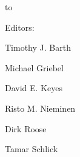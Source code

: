 \bgroup
\setcounter{page}{1}

\nolinenumbers


\def\plseries#1{\noindent \fontfamily{ptm}\fontsize{16}{18}{\selectfont #1\par}}


\def\plserieseditor#1{\noindent \fontfamily{ptm}\fontsize{10}{12}{\selectfont #1\par}}

\def\plseriesid#1{\noindent \fontfamily{ptm}\fontsize{9}{11}{\selectfont #1\par}}

\def\pleditor#1{\noindent \fontfamily{ptm}\fontsize{14}{16}{\selectfont #1\par}}

\def\pltitle#1{\noindent \fontfamily{ptm}\fontsize{28}{30}{\selectfont #1\par}}

\def\plsubtitle#1{\noindent \fontfamily{ptm}\fontsize{18}{20}{\selectfont #1\par}}



\begin{minipage}{0.96\textwidth}{\vspace*{-40pt}\hfill{\fontsize{30}{32}\selectfont{84}}}\end{minipage}

\vspace*{-6pt}

\hbox to \textwidth{\hrulefill}

\thispagestyle{empty}

\vspace*{18pt}

{\noindent{}\fontsize{12}{14}\selectfont Editors:\par\vspace*{9pt}
\noindent Timothy J. Barth\par
\noindent Michael Griebel\par
\noindent David E. Keyes\par
\noindent Risto M. Nieminen\par
\noindent Dirk Roose\par
\noindent Tamar Schlick\par}

